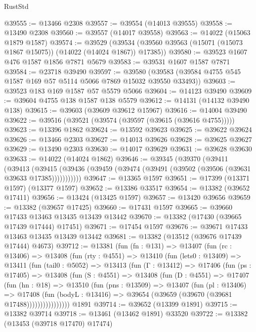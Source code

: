 \begin{lexlean}{RustStd}
\begin{coremodule}
@39555 := @13466 @2308
@39557 := @39554 (@14013 @39555)
@39558 := @13490 @2308
@39560 := @39557 (@14017 @39558)
@39563 := @14022 (@15063 @1879 @1587)
@39574 := @39529
    (@39534 (@39560 @39563 (@15071 (@15073 @1867 @15075)) (@14022 (@14024 @1867)) @17385))
@39580 := @39523 @1607 @476 @1587 @1856 @7871 @5679
@39583 := @39531 @1607 @1587 @7871
@39584 := @23718 @39490
@39597 := @39580 (@39583 (@39584 @4755 @545 @1587 @169 @57 @5114 @5066 @7869 @15032 @39550 @33493))
@39603 := @39523 @183 @169 @1587 @57 @5579 @5066
@39604 := @14123 @39490
@39609 := @39604 @4755 @138 @1587 @138 @5579
@39612 := @14131 (@14132 @39490 @138)
@39615 := @39603 (@39609 @39612 @15967)
@39616 := @14004 @39490
@39622 := @39516 (@39521 (@39574 (@39597 (@39615 (@39616 @4755)))))
@39623 := @13396 @1862
@39624 := @13592 @39623
@39625 := @39622 @39624
@39626 := @13466 @2303
@39627 := @14013 @39626
@39628 := @39625 @39627
@39629 := @13490 @2303
@39630 := @14017 @39629
@39631 := @39628 @39630
@39633 := @14022 (@14024 @1862)
@39646 := @39345
    (@39370
      (@39411
        (@39413
          (@39415 (@39436 (@39459 (@39474 (@39491 (@39502 (@39506 (@39631 @39633 @17385)))))))))))
@39647 := @13365 @1597
@39651 := @17399 (@13371 @1597) (@13377 @1597)
@39652 := @13386 @33517
@39654 := @13382 (@39652 @17411)
@39656 := @13424 (@13425 @1597)
@39657 := @13420 @39656
@39659 := @13382 (@39657 @17425)
@39660 := @17431 @1597
@39665 := @39660 @17433 @13463 @13435 @13439 @13442
@39670 := @13382 (@17430 (@39665 @17439 @17444) @17451)
@39671 := @17454 @1597
@39676 := @39671 @17433 @13463 @13435 @13439 @13442
@39681 := @13382 (@13512 (@39676 @17439 @17444) @4673)
@39712 := @13381
    (fun (fn : @131) =>
    @13407
      (fun (rc : @13406) =>
      @13408
        (fun (rty : @4551) =>
        @13410
          (fun (lets0 : @13409) =>
          @13411
            (fun (tail0 : @5052) =>
            @13413
              (fun (Γ : @13412) =>
              @17406
                (fun (ps : @17405) =>
                @13408
                  (fun (S : @4551) =>
                  @13408
                    (fun (D : @4551) =>
                    @17407
                      (fun (hn : @18) =>
                      @13510
                        (fun (pns : @13509) =>
                        @13407
                          (fun (pl : @13406) =>
                          @17408
                            (fun (bodyL : @13416) =>
                            @39654 (@39659 (@39670 (@39681 @17488))))))))))))))))
    @1891
@39714 := @39652 (@13399 @1891)
@39715 := @13382 @39714
@39718 := @13461 (@13462 @1891) @33520
@39722 := @13382 (@13453 (@39718 @17470) @17474)

\end{coremodule}
\end{lexlean}
